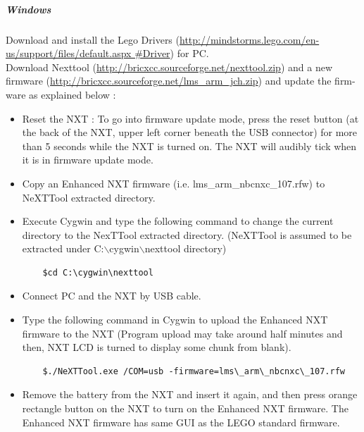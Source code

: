 \subparagraph{Windows}
Download and install the Lego Drivers (\href{http://mindstorms.lego.com/en-us/support/files/default.aspx#Driver}{http://mindstorms.lego.com/en-us/support/files/default.aspx
\#Driver}) for PC. \\
Download Nexttool (\href{http://bricxcc.sourceforge.net/nexttool.zip}{http://bricxcc.sourceforge.net/nexttool.zip}) and a new firmware (\href{http://bricxcc.sourceforge.net/lms_arm_jch.zip}{http://bricxcc.sourceforge.net/lms\_arm\_jch.zip}) and update the firm-ware as explained below :
\begin{itemize}
\item Reset the NXT : To go into firmware update mode, press the reset button (at the back of the NXT, upper left corner beneath the USB connector) for more than 5 seconds while the NXT is turned on. The NXT will audibly tick when it is in firmware update mode.
\item Copy an Enhanced NXT firmware (i.e. lms\_arm\_nbcnxc\_107.rfw) to NeXTTool extracted directory.
\item Execute Cygwin and type the following command to change the current directory to the NexTTool extracted directory. (NeXTTool is assumed to be extracted under C:$\backslash$cygwin$\backslash$nexttool directory)
	\begin{verbatim}
	$cd C:\cygwin\nexttool
	\end{verbatim}
\item Connect PC and the NXT by USB cable.
\item Type the following command in Cygwin to upload the Enhanced NXT firmware to the NXT (Program upload may take around half minutes and then, NXT LCD is turned to display some chunk from blank).
	\begin{verbatim}
	$./NeXTTool.exe /COM=usb -firmware=lms\_arm\_nbcnxc\_107.rfw
	\end{verbatim}
\item Remove the battery from the NXT and insert it again, and then press orange rectangle button on the NXT to turn on the Enhanced NXT firmware. The Enhanced NXT firmware has same GUI as the LEGO standard firmware.
\end{itemize}





